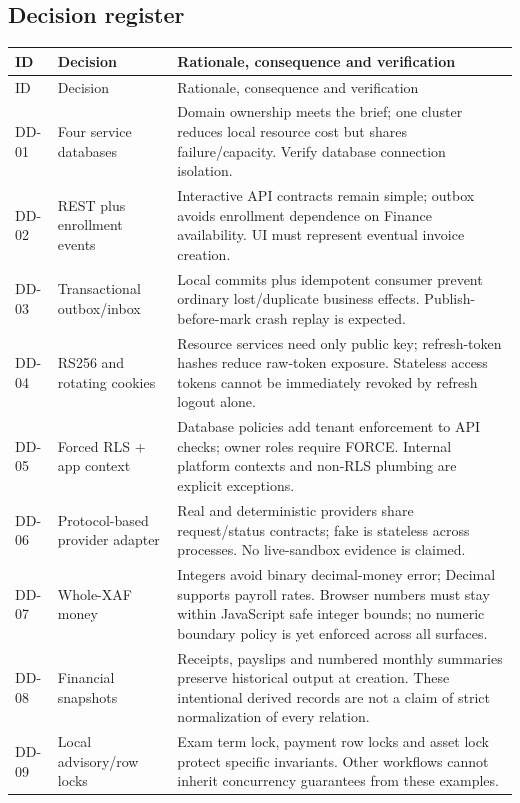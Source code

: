 \documentclass[10pt,a4paper]{article}
\begin{document}
\subsection{Decision register}
\small
\begin{longtable}{@{}L{16mm}L{37mm}L{107mm}@{}}
\toprule ID & Decision & Rationale, consequence and verification\\\midrule\endfirsthead
\toprule ID & Decision & Rationale, consequence and verification\\\midrule\endhead
\bottomrule\endfoot
DD-01 & Four service databases & Domain ownership meets the brief; one cluster reduces local resource cost but shares failure/capacity. Verify database connection isolation.\\
DD-02 & REST plus enrollment events & Interactive API contracts remain simple; outbox avoids enrollment dependence on Finance availability. UI must represent eventual invoice creation.\\
DD-03 & Transactional outbox/inbox & Local commits plus idempotent consumer prevent ordinary lost/duplicate business effects. Publish-before-mark crash replay is expected.\\
DD-04 & RS256 and rotating cookies & Resource services need only public key; refresh-token hashes reduce raw-token exposure. Stateless access tokens cannot be immediately revoked by refresh logout alone.\\
DD-05 & Forced RLS + app context & Database policies add tenant enforcement to API checks; owner roles require FORCE. Internal platform contexts and non-RLS plumbing are explicit exceptions.\\
DD-06 & Protocol-based provider adapter & Real and deterministic providers share request/status contracts; fake is stateless across processes. No live-sandbox evidence is claimed.\\
DD-07 & Whole-XAF money & Integers avoid binary decimal-money error; Decimal supports payroll rates. Browser numbers must stay within JavaScript safe integer bounds; no numeric boundary policy is yet enforced across all surfaces.\\
DD-08 & Financial snapshots & Receipts, payslips and numbered monthly summaries preserve historical output at creation. These intentional derived records are not a claim of strict normalization of every relation.\\
DD-09 & Local advisory/row locks & Exam term lock, payment row locks and asset lock protect specific invariants. Other workflows cannot inherit concurrency guarantees from these examples.\\

\end{longtable}
\end{document}
